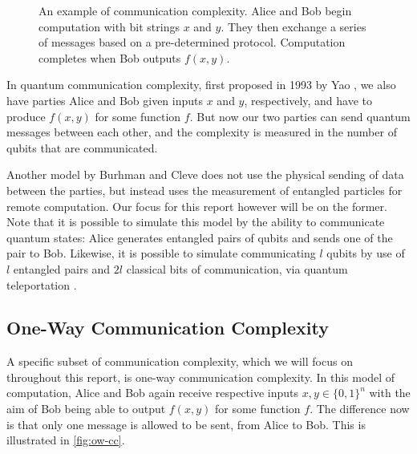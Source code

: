 \documentclass[a4paper]{article}
\begin{document}
        \begin{figure}
            \centering
            \caption{An example of communication complexity. Alice and Bob begin computation with bit strings $x$ and $y$. They then exchange a series of messages based on a pre-determined protocol. Computation completes when Bob outputs $f(x, y)$.}
            \label{fig:cc}
        \end{figure}

        In quantum communication complexity, first proposed in 1993 by Yao \cite{366852}, we also have parties Alice and Bob given inputs $x$ and $y$, respectively, and have to produce $f(x, y)$ for some function $f$. But now our two parties can send quantum messages between each other, and the complexity is measured in the number of qubits that are communicated.

        Another model by Burhman and Cleve \cite{quant-ph/9704026} does not use the physical sending of data between the parties, but instead uses the measurement of entangled particles for remote computation. Our focus for this report however will be on the former. Note that it is possible to simulate this model by the ability to communicate quantum states: Alice generates entangled pairs of qubits and sends one of the pair to Bob. Likewise, it is possible to simulate communicating $l$ qubits by use of $l$ entangled pairs and $2l$ classical bits of communication, via quantum teleportation \cite{PhysRevLett.70.1895}.

        \subsection{One-Way Communication Complexity}

        A specific subset of communication complexity, which we will focus on throughout this report, is one-way communication complexity. In this model of computation, Alice and Bob again receive respective inputs $x, y \in \{0, 1\}^n$ with the aim of Bob being able to output $f(x, y)$ for some function $f$. The difference now is that only one message is allowed to be sent, from Alice to Bob. This is illustrated in \ref{fig:ow-cc}.
\end{document}
